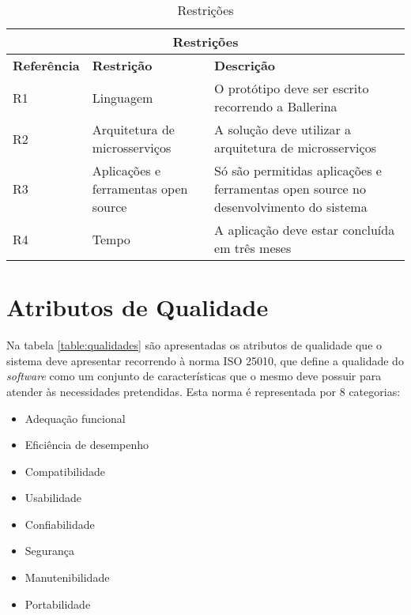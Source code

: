\begin{table}[H]
\caption{Restrições}
\label{table:restricoes}
\begin{center}
\begin{tabular}{ |p{3cm}|p{3cm}|p{6cm}|  }
\hline
\multicolumn{3}{|c|}{Restrições} \\
\hline
\textbf{Referência} & \textbf{Restrição} & \textbf{Descrição} \\
\hline
R1 & Linguagem & O protótipo deve ser escrito recorrendo a Ballerina\\
\hline
R2 & Arquitetura de microsserviços &  A solução deve utilizar a arquitetura de microsserviços\\
\hline
R3 & Aplicações e ferramentas open source & Só são permitidas aplicações e ferramentas open source no desenvolvimento do sistema\\
\hline
R4 & Tempo & A aplicação deve estar concluída em três meses\\
\hline
\end{tabular} 
\end{center}
\end{table}


\section{Atributos de Qualidade}

Na tabela \ref{table:qualidades} são apresentadas os atributos de qualidade que o sistema deve apresentar recorrendo à norma ISO 25010, que define a qualidade do \textit{software} como um conjunto de características que o mesmo deve possuir para atender às necessidades pretendidas. Esta norma é representada por 8 categorias:
\begin{itemize}
    \item Adequação funcional
    \item Eficiência de desempenho
    \item Compatibilidade
    \item Usabilidade
    \item Confiabilidade
    \item Segurança
    \item Manutenibilidade
    \item Portabilidade
\end{itemize}
\begin{flushright}
\cite{iso25010cat}
\end{flushright}

